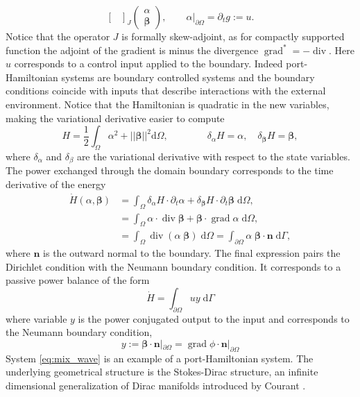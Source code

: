 \documentclass[11pt,a4paper]{article}
\DeclareMathOperator*{\grad}{grad}
\renewcommand{\div}{\operatorname{div}}
\begin{document}
{\begin{equation}
{\begin{bmatrix}
    \end{bmatrix}}_{J}
    \begin{pmatrix}
        \alpha \\
        \bm{\beta}
    \end{pmatrix}, \qquad \alpha|_{\partial \Omega} = \partial_t g:= u.
\end{equation}
Notice that the operator $J$ is formally skew-adjoint, as for compactly supported function the adjoint of the gradient is minus the divergence $\grad^*= -\div$. Here $u$ corresponds to a control input applied to the boundary. Indeed port-Hamiltonian systems are boundary controlled systems and the boundary conditions coincide with inputs that describe interactions with the external environment. Notice that the Hamiltonian is quadratic in the new variables, making the variational derivative easier to compute
$$
H = \frac{1}{2} \int_\Omega \alpha^2 + ||\bm \beta||^2 \mathrm{d}\Omega, \qquad \qquad \delta_{\alpha} H = \alpha, \quad \delta_{\bm\beta} H = \bm\beta,
$$
where $\delta_\alpha$ and $\delta_\beta$ are the variational derivative with respect to the state variables. The power exchanged through the domain boundary corresponds to the time derivative of the energy
\begin{equation}
	\label{eq:wave_power_balance}
\begin{aligned}
\dot{H}(\alpha,\bm\beta) &= \int_\Omega \delta_\alpha H \cdot \partial_t \alpha + \delta_{\bm\beta} H \cdot \partial_t \bm{\beta} \; \mathrm{d}\Omega, \\
&= \int_\Omega \alpha \cdot \div \bm{\beta} + \bm\beta \cdot \grad {\alpha} \; \mathrm{d}\Omega, \\
&= \int_\Omega \div(\alpha \; \bm{\beta}) \; \mathrm{d}\Omega = \int_{\partial\Omega} \alpha \; \bm{\beta} \cdot \bm{n} \; \mathrm{d}\Gamma,
\end{aligned}
\end{equation}
where $\bm{n}$ is the outward normal to the boundary. The final expression pairs the Dirichlet condition with the Neumann boundary condition. It corresponds to a passive power balance of the form
$$
\dot{H} = \int_{\partial\Omega} u y\; \mathrm{d}\Gamma
$$
where variable ${y}$ is the power conjugated output to the input and corresponds to the Neumann boundary condition, 
\begin{equation}
    y := \bm{\beta} \cdot \bm{n}|_{\partial\Omega} = \grad \phi \cdot \bm{n}|_{\partial\Omega}  
\end{equation}
System \eqref{eq:mix_wave} is an example of a port-Hamiltonian system. The underlying geometrical structure is the Stokes-Dirac structure, an infinite dimensional generalization of Dirac manifolds introduced by Courant \cite{courant1990}.
}
\end{document}

